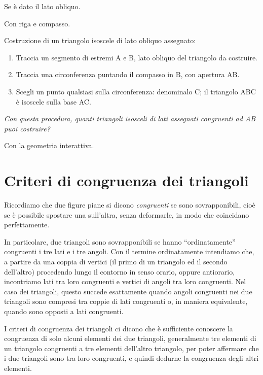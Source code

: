 Se è dato il lato obliquo.

Con riga e compasso.

 \begin{procedura}
   Costruzione di un triangolo isoscele di lato obliquo assegnato:
   \begin{enumerate} [nosep]
     \item 
     Traccia un segmento di estremi A e B, lato obliquo del triangolo da 
costruire.  
     \item 
     Traccia una circonferenza puntando il compasso in B, con apertura AB.  
     \item 
     Scegli un punto qualsiasi sulla circonferenza: denominalo C; il triangolo 
ABC è isoscele sulla base AC.  
   \end{enumerate}
   \textit{ Con questa procedura, quanti triangoli isosceli di lati assegnati 
congruenti ad AB puoi costruire?}  
 \end{procedura}
 
Con la geometria interattiva.


\section{Criteri di congruenza dei triangoli}
\label{sect:primo_secondo_criterio_di_congruenza_triangoli}

Ricordiamo che due figure piane si dicono \emph{congruenti} se sono 
sovrapponibili, cioè se è possibile spostare una sull'altra, senza 
deformarle, in modo che coincidano perfettamente. 

In particolare, due triangoli sono sovrapponibili se hanno 
``ordinatamente'' congruenti i tre lati e i tre angoli. Con il 
termine ordinatamente intendiamo che, a partire da una coppia di 
vertici (il primo di un triangolo ed il secondo dell'altro) procedendo 
lungo il contorno in senso orario, oppure antiorario, incontriamo lati 
tra loro congruenti e vertici di angoli tra loro congruenti. Nel caso 
dei triangoli, questo succede esattamente quando angoli congruenti nei 
due triangoli sono compresi tra coppie di lati congruenti o, in 
maniera equivalente, quando sono opposti a lati congruenti.

I criteri di congruenza dei triangoli ci dicono che è sufficiente 
conoscere la congruenza di solo alcuni elementi dei due triangoli, 
generalmente tre elementi di un triangolo congruenti a tre elementi 
dell'altro triangolo, per poter affermare che i due triangoli sono 
tra loro congruenti, e quindi dedurne la congruenza degli altri 
elementi.

